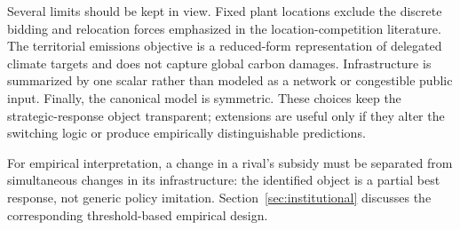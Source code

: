 Several limits should be kept in view. Fixed plant locations exclude the discrete bidding and relocation forces emphasized in the location-competition literature. The territorial emissions objective is a reduced-form representation of delegated climate targets and does not capture global carbon damages. Infrastructure is summarized by one scalar rather than modeled as a network or congestible public input. Finally, the canonical model is symmetric. These choices keep the strategic-response object transparent; extensions are useful only if they alter the switching logic or produce empirically distinguishable predictions.

For empirical interpretation, a change in a rival's subsidy must be separated from simultaneous changes in its infrastructure: the identified object is a partial best response, not generic policy imitation. Section~\ref{sec:institutional} discusses the corresponding threshold-based empirical design.